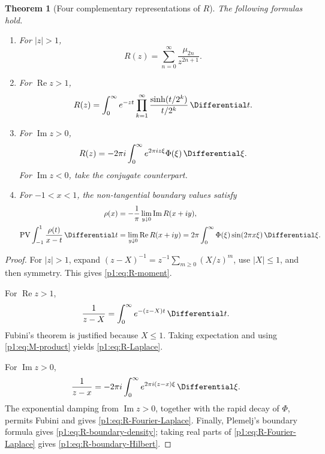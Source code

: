 \documentclass[11pt]{article}
\newtheorem{theorem}{Theorem}[section]
\theoremstyle{definition}
\theoremstyle{remark}
\newcommand{\PV}{\operatorname{PV}}
\begin{document}
\begin{theorem}[Four complementary representations of \(R\)]\label{p1:thm:R-representations}
The following formulas hold.

\begin{enumerate}[label=(\roman*)]
\item For \(|z|>1\),
\begin{equation}
 R(z)=\sum_{n=0}^{\infty}\frac{\mu_{2n}}{z^{2n+1}}.          \label{p1:eq:R-moment}
\end{equation}
\item For \(\operatorname{Re}z>1\),
\begin{equation}
 R(z)=\int_0^{\infty}e^{-zt}
 \prod_{k=1}^{\infty}\frac{\sinh(t/2^k)}{t/2^k}\,\Differential t.    \label{p1:eq:R-Laplace}
\end{equation}
\item For \(\operatorname{Im}z>0\),
\begin{equation}
 R(z)=-2\pi i\int_0^{\infty}e^{2\pi i z\xi}\Phi(\xi)\,\Differential\xi. \label{p1:eq:R-Fourier-Laplace}
\end{equation}
For \(\operatorname{Im}z<0\), take the conjugate counterpart.
\item For \(-1<x<1\), the non-tangential boundary values satisfy
\begin{align}
 \rho(x)&=-\frac1\pi\lim_{y\downarrow0}\operatorname{Im}R(x+iy),
                                                               \label{p1:eq:R-boundary-density}\\
 \PV\int_{-1}^{1}\frac{\rho(t)}{x-t}\,\Differential t
 &=\lim_{y\downarrow0}\operatorname{Re}R(x+iy)
 =2\pi\int_0^{\infty}\Phi(\xi)\sin(2\pi x\xi)\,\Differential\xi.     \label{p1:eq:R-boundary-Hilbert}
\end{align}
\end{enumerate}
\end{theorem}

\begin{proof}
For \(|z|>1\), expand \((z-X)^{-1}=z^{-1}\sum_{m\ge0}(X/z)^m\), use
\(|X|\le1\), and then symmetry.  This gives \eqref{p1:eq:R-moment}.

For \(\operatorname{Re}z>1\),
\[
 \frac1{z-X}=\int_0^{\infty}e^{-(z-X)t}\,\Differential t.
\]
Fubini's theorem is justified because \(X\le1\).  Taking expectation and using
\eqref{p1:eq:M-product} yields \eqref{p1:eq:R-Laplace}.

For \(\operatorname{Im}z>0\),
\[
 \frac1{z-x}=-2\pi i\int_0^{\infty}e^{2\pi i(z-x)\xi}\,\Differential\xi.
\]
The exponential damping from \(\operatorname{Im}z>0\), together with the rapid decay of
\(\Phi\), permits Fubini and gives \eqref{p1:eq:R-Fourier-Laplace}.  Finally,
Plemelj's boundary formula gives \eqref{p1:eq:R-boundary-density}; taking real parts of
\eqref{p1:eq:R-Fourier-Laplace} gives \eqref{p1:eq:R-boundary-Hilbert}.
\end{proof}
\end{document}
